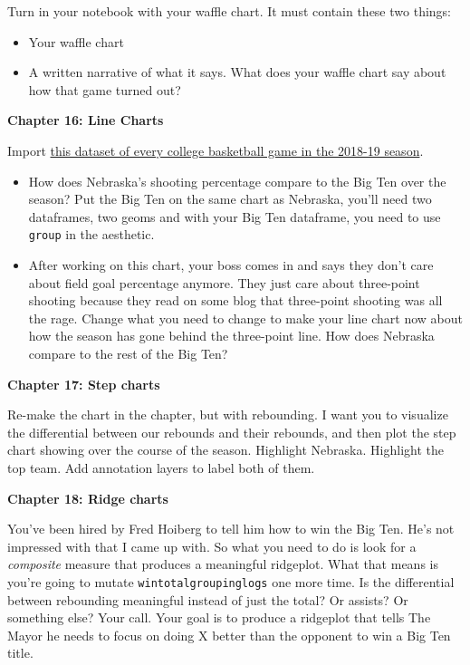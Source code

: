 \documentclass[
]{book}
\providecommand{\tightlist}{%
  \setlength{\itemsep}{0pt}\setlength{\parskip}{0pt}}
\begin{document}
Turn in your notebook with your waffle chart. It must contain these two things:

\begin{itemize}
\tightlist
\item
  Your waffle chart
\item
  A written narrative of what it says. What does your waffle chart say about how that game turned out?
\end{itemize}

\textbf{Chapter 16: Line Charts}

Import \href{https://unl.box.com/s/a8m91bro10t89watsyo13yjegb1fy009}{this dataset of every college basketball game in the 2018-19 season}.

\begin{itemize}
\item
  How does Nebraska's shooting percentage compare to the Big Ten over the season? Put the Big Ten on the same chart as Nebraska, you'll need two dataframes, two geoms and with your Big Ten dataframe, you need to use \texttt{group} in the aesthetic.
\item
  After working on this chart, your boss comes in and says they don't care about field goal percentage anymore. They just care about three-point shooting because they read on some blog that three-point shooting was all the rage. Change what you need to change to make your line chart now about how the season has gone behind the three-point line. How does Nebraska compare to the rest of the Big Ten?
\end{itemize}

\textbf{Chapter 17: Step charts}

Re-make the chart in the chapter, but with rebounding. I want you to visualize the differential between our rebounds and their rebounds, and then plot the step chart showing over the course of the season. Highlight Nebraska. Highlight the top team. Add annotation layers to label both of them.

\textbf{Chapter 18: Ridge charts}

You've been hired by Fred Hoiberg to tell him how to win the Big Ten. He's not impressed with that I came up with. So what you need to do is look for a \emph{composite} measure that produces a meaningful ridgeplot. What that means is you're going to mutate \texttt{wintotalgroupinglogs} one more time. Is the differential between rebounding meaningful instead of just the total? Or assists? Or something else? Your call. Your goal is to produce a ridgeplot that tells The Mayor he needs to focus on doing X better than the opponent to win a Big Ten title.
\end{document}
